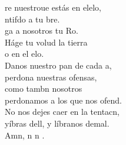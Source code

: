\begin{cancion}%
	re nuestroue estás en elelo,\\
	ntifdo a tu bre.\\
	ga a nosotros tu Ro.\\
	Háge tu volud la tierra \\
	o en el elo.\\
	Danos  nuestro pan de cada a, \\
perdona nuestras ofensas, \\
	como tambn nosotros\\
	perdonamos a los que nos ofend.\\
	No nos dejes caer en la tentacn,\\
	yíbras dell, y líbranos demal.\\
	Amn, n n .  \\
\end{cancion}%
